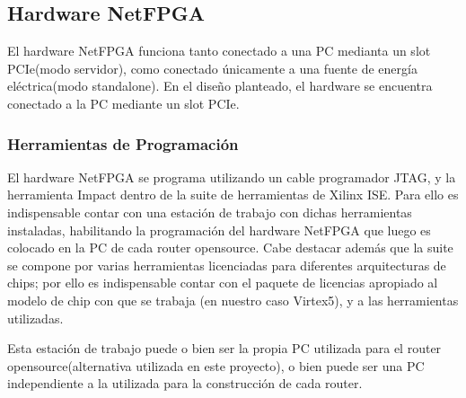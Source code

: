 \subsection{Hardware NetFPGA}

El hardware NetFPGA funciona tanto conectado a una PC medianta un slot PCIe(modo servidor), como conectado \'unicamente a una fuente de energ\'ia el\'ectrica(modo standalone). En el dise\~no planteado, el hardware se encuentra conectado a la PC mediante un slot PCIe.


\subsubsection{Herramientas de Programaci\'on}

El hardware NetFPGA se programa utilizando un cable programador JTAG, y la herramienta Impact dentro de la suite de herramientas de Xilinx ISE. Para ello es indispensable contar con una estaci\'on de trabajo con dichas herramientas instaladas, habilitando la programaci\'on  del hardware NetFPGA que luego es colocado en la PC de cada router opensource. Cabe destacar adem\'as que la suite se compone por varias herramientas licenciadas para diferentes arquitecturas de chips; por ello es indispensable contar con el paquete de licencias apropiado al modelo de chip con que se trabaja (en nuestro caso Virtex5), y a las herramientas utilizadas. 

Esta estaci\'on de trabajo puede o bien ser la propia PC utilizada para el router opensource(alternativa utilizada en este proyecto), o bien puede ser una PC independiente a la utilizada para la construcci\'on de cada router.\\


